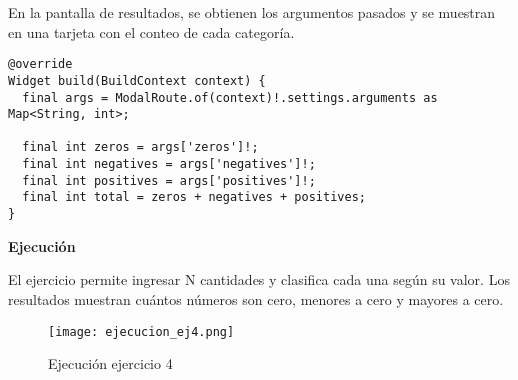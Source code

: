 En la pantalla de resultados, se obtienen los argumentos pasados y se muestran en una tarjeta con el conteo de cada categoría.

\begin{center}
\begin{lstlisting}
@override
Widget build(BuildContext context) {
  final args = ModalRoute.of(context)!.settings.arguments as Map<String, int>;

  final int zeros = args['zeros']!;
  final int negatives = args['negatives']!;
  final int positives = args['positives']!;
  final int total = zeros + negatives + positives;
}
\end{lstlisting}
\end{center}

\textbf{Ejecución}

El ejercicio permite ingresar N cantidades y clasifica cada una según su valor. Los resultados muestran cuántos números son cero, menores a cero y mayores a cero.

\begin{figure}[H]
    \centering
    \texttt{[image: ejecucion\_ej4.png]}
    \caption{Ejecución ejercicio 4}
    \label{fig:ej4_ejecuccion}
\end{figure}
